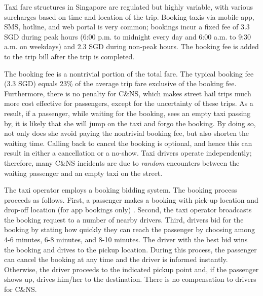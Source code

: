\documentclass[reviewmode,AEJ]{AEA}
\begin{document}
Taxi fare structures in Singapore are regulated but highly variable, with various surcharges based on time and location of the trip. 
Booking taxis via mobile app, SMS, hotline, and web portal is very common; bookings incur a fixed fee of %
3.3 SGD during peak hours (6:00 p.m. to midnight every day and 6:00 a.m. to 9:30 a.m. on weekdays) and 2.3 SGD during non-peak hours. 
The booking fee is added to the trip bill after the trip is completed. 

The booking fee is a nontrivial portion of the total fare. The typical booking fee (3.3 SGD) equals 23\% of the average trip fare exclusive of the booking fee. Furthermore, there is no penalty for C\&NS, which makes street hail trips 
much more cost effective for passengers, except for the uncertainty of these trips. As a result, if a passenger, while waiting for the booking, sees an empty taxi passing by, it is likely that she will jump on the taxi and forgo the booking. By doing so, not only does she avoid paying the nontrivial booking fee, but also shorten the waiting time. Calling back to cancel the booking is optional, and hence this can result in either a cancellation or a no-show. Taxi drivers operate independently; therefore, many C\&NS incidents are due to \textit{random} encounters between the waiting passenger and an empty taxi on the street.

The taxi operator employs a booking bidding system. The booking process proceeds as follows. 
First, a passenger makes a booking %
with pick-up location and drop-off location (for app bookings only)%
. Second, the taxi operator broadcasts the booking request to a number of 
nearby drivers. Third, drivers bid for the booking by stating how quickly they can reach the passenger 
by choosing among 4-6 minutes, 6-8 minutes, and 8-10 minutes. The driver with the best bid wins the
booking and drives to the pickup location. During this process, the passenger can cancel the booking
at any time and the driver is informed %
instantly. Otherwise, the driver proceeds
to the indicated pickup point and, if the passenger shows up, drives him/her to the destination. 
There is no compensation to drivers for C\&NS.
\end{document}
